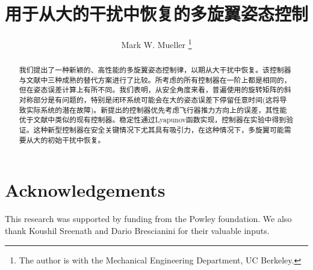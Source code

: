 \documentclass[conference]{IEEEtran}
\title{\LARGE \bf
用于从大的干扰中恢复的多旋翼姿态控制
}
\author{
Mark W. Mueller%
\thanks{The author is with the Mechanical Engineering Department, UC Berkeley.
\newline        {\tt\small mwm@berkeley.edu}}%
}
\begin{document}
\maketitle
\thispagestyle{empty}
\pagestyle{empty}

\begin{abstract}

我们提出了一种新颖的、高性能的多旋翼姿态控制律，以期从大干扰中恢复。该控制器与文献中三种成熟的替代方案进行了比较。所考虑的所有控制器在一阶上都是相同的，但在姿态误差计算上有所不同。我们表明，从安全角度来看，普遍使用的旋转矩阵的斜对称部分是有问题的，特别是闭环系统可能会在大的姿态误差下停留任意时间(这将导致实际系统的潜在故障)。新提出的控制器优先考虑飞行器推力方向上的误差，其性能优于文献中类似的现有控制器。稳定性通过Lyapunov函数实现，控制器在实验中得到验证。这种新型控制器在安全关键情况下尤其具有吸引力，在这种情况下，多旋翼可能需要从大的初始干扰中恢复。

\end{abstract}

 
 
 
 
 


\section*{Acknowledgements}
This research was supported by funding from the Powley foundation.
We also thank Koushil Sreenath and Dario Brescianini for their valuable inputs. 




%
%
\end{document}
